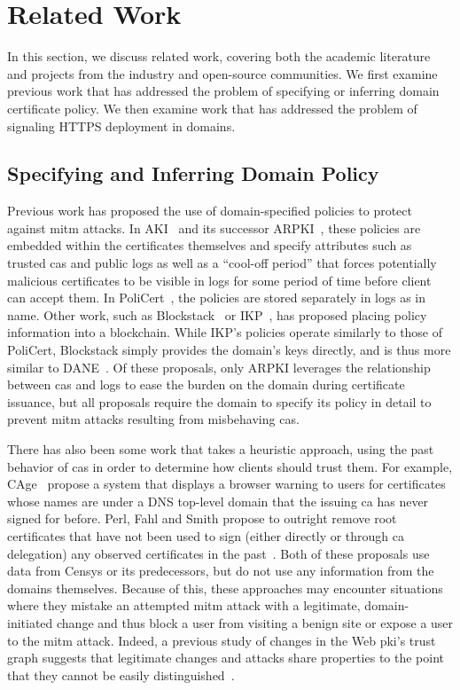 \section{Related Work}
\label{sec:related}

In this section, we discuss related work, covering both the academic literature
and projects from the industry and open-source communities. We first examine
previous work that has addressed the problem of specifying or inferring domain
certificate policy. We then examine work that has addressed the problem of
signaling HTTPS deployment in domains.

\subsection{Specifying and Inferring Domain Policy}

Previous work has proposed the use of domain-specified policies to protect
against \ac{mitm} attacks. In AKI~\cite{kim2013accountable} and its successor
ARPKI~\cite{basin2014arpki}, these policies are embedded within the certificates
themselves and specify attributes such as trusted \acp{ca} and public logs as
well as a ``cool-off period'' that forces potentially malicious certificates to
be visible in logs for some period of time before client can accept them. In
PoliCert~\cite{szalachowski2014policert}, the policies are stored separately in
logs as in \ac{name}. Other work, such as Blockstack~\cite{ali2016blockstack} or
IKP~\cite{matsumoto2017ikp}, has proposed placing policy information into a
blockchain. While IKP's policies operate similarly to those of PoliCert,
Blockstack simply provides the domain's keys directly, and is thus more similar
to DANE~\cite{rfc6698}. Of these proposals, only ARPKI leverages the
relationship between \acp{ca} and logs to ease the burden on the domain during
certificate issuance, but all proposals require the domain to specify its policy
in detail to prevent \ac{mitm} attacks resulting from misbehaving \acp{ca}.

There has also been some work that takes a heuristic approach, using the past
behavior of \acp{ca} in order to determine how clients should trust them. For
example, CAge~\cite{kasten2013cage} propose a system that displays a browser
warning to users for certificates whose names are under a DNS top-level domain
that the issuing \ac{ca} has never signed for before. Perl, Fahl and Smith
propose to outright remove root certificates that have not been used to sign
(either directly or through \ac{ca} delegation) any observed certificates in the
past~\cite{perl2014you}. Both of these proposals use data from Censys or its
predecessors, but do not use any information from the domains themselves.
Because of this, these approaches may encounter situations where they mistake an
attempted \ac{mitm} attack with a legitimate, domain-initiated change and thus
block a user from visiting a benign site or expose a user to the \ac{mitm}
attack. Indeed, a previous study of changes in the Web \ac{pki}'s trust graph
suggests that legitimate changes and attacks share properties to the point that
they cannot be easily distinguished~\cite{amann2013no}.

